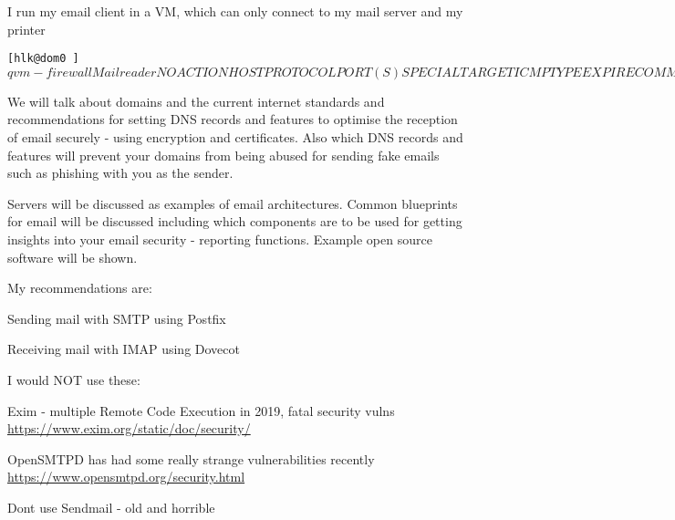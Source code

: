 \documentclass[Screen16to9,17pt]{foils}
\begin{document}





I run my email client in a VM, which can only connect to my mail server and my printer

\begin{alltt}\footnotesize
[hlk@dom0 ~]$ qvm-firewall Mailreader
NO  ACTION  HOST             PROTOCOL  PORT(S)  SPECIAL TARGET  ICMP TYPE  EXPIRE  COMMENT
0   accept  91.102.91.22/32  tcp       993      -               -          -       -
1   accept  91.102.91.22/32  tcp       587      -               -          -       -
2   accept  10.0.42.13/32    tcp       515      -               -          -       -
3   drop    -                -         -        -               -          -       -
[hlk@dom0 ~]$
\end{alltt}



We will talk about domains and the current internet standards and recommendations for setting DNS records and features to optimise the reception of email securely - using encryption and certificates. Also which DNS records and features will prevent your domains from being abused for sending fake emails such as phishing with you as the sender.

Servers will be discussed as examples of email architectures. Common blueprints for email will be discussed including which components are to be used for getting insights into your email security - reporting functions. Example open source software will be shown.



My recommendations are:
\begin{list2}
\item Sending mail with SMTP using Postfix
\item Receiving mail with IMAP using Dovecot
\end{list2}

I would NOT use these:
\begin{list2}
\item Exim - multiple Remote Code Execution in 2019, fatal security vulns \\
\url{https://www.exim.org/static/doc/security/}
\item OpenSMTPD has had some really strange vulnerabilities recently\\
\url{https://www.opensmtpd.org/security.html}
\item Dont use Sendmail - old and horrible
\end{list2}
\end{document}
